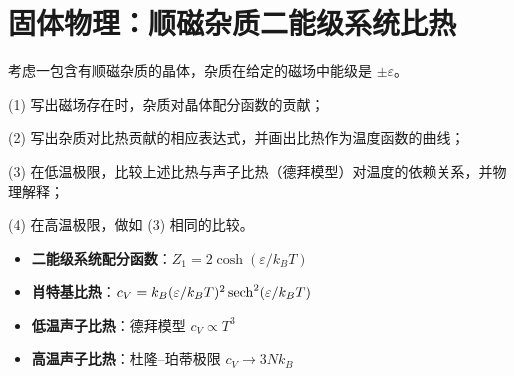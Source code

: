 \section{固体物理：顺磁杂质二能级系统比热}
\label{sec:schottky-anomaly}

\begin{modelbox}[题目：顺磁杂质对比热的贡献]
考虑一包含有顺磁杂质的晶体，杂质在给定的磁场中能级是 $\pm\varepsilon$。

(1) 写出磁场存在时，杂质对晶体配分函数的贡献；

(2) 写出杂质对比热贡献的相应表达式，并画出比热作为温度函数的曲线；

(3) 在低温极限，比较上述比热与声子比热（德拜模型）对温度的依赖关系，并物理解释；

(4) 在高温极限，做如 (3) 相同的比较。
\end{modelbox}

\begin{tipbox}[考点快速分析]
\begin{itemize}
    \item \textbf{二能级系统配分函数}：$Z_1=2\cosh(\varepsilon/k_BT)$
    \item \textbf{肖特基比热}：$c_V=k_B(\varepsilon/k_BT)^2\sech^2(\varepsilon/k_BT)$
    \item \textbf{低温声子比热}：德拜模型 $c_V\propto T^3$
    \item \textbf{高温声子比热}：杜隆--珀蒂极限 $c_V\to3Nk_B$
\end{itemize}
\end{tipbox}

